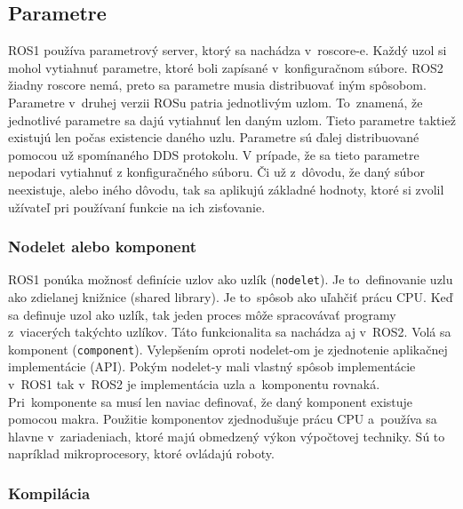 \subsection{Parametre}

	ROS1 používa parametrový server, ktorý sa nachádza v~roscore-e. Každý uzol si mohol vytiahnuť parametre, ktoré boli zapísané v~konfiguračnom
	súbore. ROS2 žiadny roscore nemá, preto sa parametre musia distribuovať iným spôsobom. Parametre v~druhej verzii ROSu patria jednotlivým uzlom.
	To~znamená, že jednotlivé parametre sa dajú vytiahnuť len daným uzlom. Tieto parametre taktiež existujú len počas existencie daného uzlu. Parametre
	sú ďalej distribuované pomocou už spomínaného DDS protokolu. V prípade, že sa tieto parametre nepodari vytiahnuť z konfiguračného súboru. Či už z~dôvodu,
	že daný súbor neexistuje, alebo iného dôvodu, tak sa aplikujú základné hodnoty, ktoré si zvolil užívateľ pri používaní funkcie na ich zisťovanie.

\subsubsection{Nodelet alebo komponent}

	ROS1 ponúka možnosť definície uzlov ako uzlík (\texttt{nodelet}). Je to~definovanie uzlu ako zdielanej knižnice (shared library). Je
	to~spôsob ako uľahčiť prácu CPU. Keď sa definuje uzol ako uzlík, tak jeden proces môže spracovávať programy z~viacerých takýchto uzlíkov.
	Táto funkcionalita sa nachádza aj v~ROS2. Volá sa komponent (\texttt{component}). Vylepšením oproti nodelet-om je zjednotenie aplikačnej
	implementácie (API). Pokým nodelet-y mali vlastný spôsob implementácie v~ROS1 tak v~ROS2 je implementácia uzla a~komponentu rovnaká.
	Pri~komponente sa musí len naviac definovať, že daný komponent existuje pomocou makra. Použitie komponentov zjednodušuje prácu CPU
	a~používa sa hlavne v~zariadeniach, ktoré majú obmedzený výkon výpočtovej techniky. Sú to napríklad mikroprocesory, ktoré ovládajú roboty.

\subsubsection{Kompilácia}

